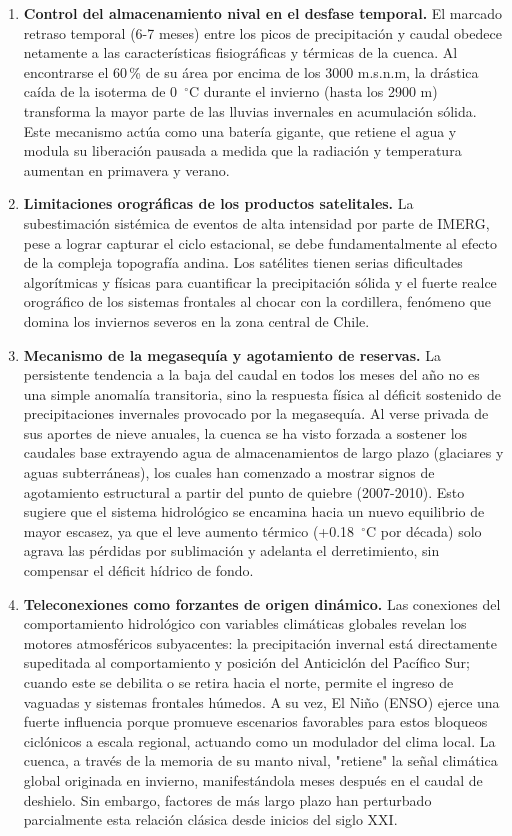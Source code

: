 \documentclass[11pt,a4paper]{article}
\begin{document}
\begin{enumerate}
\item \textbf{Control del almacenamiento nival en el desfase temporal.} El marcado retraso temporal (6-7 meses) entre los picos de precipitación y caudal obedece netamente a las características fisiográficas y térmicas de la cuenca. Al encontrarse el 60\,\% de su área por encima de los 3000 m.s.n.m, la drástica caída de la isoterma de 0~$^\circ$C durante el invierno (hasta los 2900 m) transforma la mayor parte de las lluvias invernales en acumulación sólida. Este mecanismo actúa como una batería gigante, que retiene el agua y modula su liberación pausada a medida que la radiación y temperatura aumentan en primavera y verano.
\item \textbf{Limitaciones orográficas de los productos satelitales.} La subestimación sistémica de eventos de alta intensidad por parte de IMERG, pese a lograr capturar el ciclo estacional, se debe fundamentalmente al efecto de la compleja topografía andina. Los satélites tienen serias dificultades algorítmicas y físicas para cuantificar la precipitación sólida y el fuerte realce orográfico de los sistemas frontales al chocar con la cordillera, fenómeno que domina los inviernos severos en la zona central de Chile.
\item \textbf{Mecanismo de la megasequía y agotamiento de reservas.} La persistente tendencia a la baja del caudal en todos los meses del año no es una simple anomalía transitoria, sino la respuesta física al déficit sostenido de precipitaciones invernales provocado por la megasequía. Al verse privada de sus aportes de nieve anuales, la cuenca se ha visto forzada a sostener los caudales base extrayendo agua de almacenamientos de largo plazo (glaciares y aguas subterráneas), los cuales han comenzado a mostrar signos de agotamiento estructural a partir del punto de quiebre (2007-2010). Esto sugiere que el sistema hidrológico se encamina hacia un nuevo equilibrio de mayor escasez, ya que el leve aumento térmico (+0.18~$^\circ$C por década) solo agrava las pérdidas por sublimación y adelanta el derretimiento, sin compensar el déficit hídrico de fondo.
\item \textbf{Teleconexiones como forzantes de origen dinámico.} Las conexiones del comportamiento hidrológico con variables climáticas globales revelan los motores atmosféricos subyacentes: la precipitación invernal está directamente supeditada al comportamiento y posición del Anticiclón del Pacífico Sur; cuando este se debilita o se retira hacia el norte, permite el ingreso de vaguadas y sistemas frontales húmedos. A su vez, El Niño (ENSO) ejerce una fuerte influencia porque promueve escenarios favorables para estos bloqueos ciclónicos a escala regional, actuando como un modulador del clima local. La cuenca, a través de la memoria de su manto nival, "retiene" la señal climática global originada en invierno, manifestándola meses después en el caudal de deshielo. Sin embargo, factores de más largo plazo han perturbado parcialmente esta relación clásica desde inicios del siglo XXI.
\end{enumerate}
\end{document}

